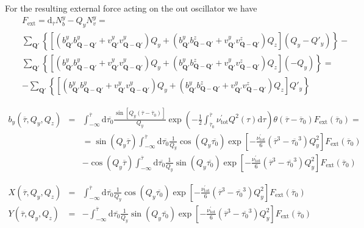 \documentclass[a4paper,11pt]{article}
\begin{document}
For the resulting external force acting on the out oscillator we have
%
\begin{eqnarray}
&&F_\mathrm{ext} =\mathrm{d}_{\overline{\tau}}N_b^y - Q_yN_v^y=\nonumber \\
&&\sum_{\mathbf{Q}'}\left\{ \left[(b_{\mathbf{Q}'}^yb_{\mathbf{Q}-\mathbf{Q}'}^y + v_{\mathbf{Q}'}^yv_{\mathbf{Q}-\mathbf{Q}'}^y)Q_y + (b_{\mathbf{Q}'}^yb_{\mathbf{Q}-\mathbf{Q}'}^z + v_{\mathbf{Q}'}^yv_{\mathbf{Q}-\mathbf{Q}'}^z)Q_z\right](Q_y-Q'_y)\right\} -\\
&&\sum_{\mathbf{Q}'}\left\{ \left[(b_{\mathbf{Q}'}^yb_{\mathbf{Q}-\mathbf{Q}'}^y + v_{\mathbf{Q}'}^yv_{\mathbf{Q}-\mathbf{Q}'}^y)Q_y + (b_{\mathbf{Q}'}^yb_{\mathbf{Q}-\mathbf{Q}'}^z + v_{\mathbf{Q}'}^yv_{\mathbf{Q}-\mathbf{Q}'}^z)Q_z\right](-Q_y)\right\}=\\
&&-\sum_{\mathbf{Q}'}\left\{ \left[(b_{\mathbf{Q}'}^yb_{\mathbf{Q}-\mathbf{Q}'}^y + v_{\mathbf{Q}'}^yv_{\mathbf{Q}-\mathbf{Q}'}^y)Q_y + (b_{\mathbf{Q}'}^yb_{\mathbf{Q}-\mathbf{Q}'}^z + v_{\mathbf{Q}'}^yv_{\mathbf{Q}-\mathbf{Q}'}^z)Q_z\right]Q'_y\right\}
\end{eqnarray}



\begin{eqnarray}
b_y(\overline{\tau},Q_y,Q_z) &=&
\int_{-\infty}^{\overline{\tau}} \mathrm{d}\overline{\tau_0} \frac{\sin[Q_y(\overline{\tau}-\overline{\tau}_0)]}{Q_y}
\exp\left(-\frac12\int^{\overline{\tau}}_{\overline{\tau}_0} \nu^\prime_\mathrm{tot} Q^2(\tau) \mathrm{d}\tau \right) \theta(\overline{\tau}-\overline{\tau}_0) F_\mathrm{ext}(\overline{\tau}_0)=\\
&&= \sin(Q_y\overline{\tau}) \int^{\overline{\tau}}_{-\infty}\mathrm{d}\overline{\tau_0} \frac1{Q_y}\cos(Q_y\overline{\tau_0})\exp\left[ -\frac{\nu^{\prime}_{\mathrm{tot}}}{6}(\overline{\tau}^3 - \overline{\tau_0}^3)Q_y^2 \right]  F_\mathrm{ext}(\overline{\tau}_0) \nonumber \\
&& - \cos(Q_y\overline{\tau}) \int^{\overline{\tau}}_{-\infty}\mathrm{d}\overline{\tau_0} \frac1{Q_y}\sin(Q_y\overline{\tau_0})\exp\left[ -\frac{\nu^{\prime}_{\mathrm{tot}}}{6}(\overline{\tau}^3 - \overline{\tau_0}^3)Q_y^2 \right]  F_\mathrm{ext}(\overline{\tau}_0) \nonumber
\end{eqnarray}

\begin{eqnarray}
 X(\overline{\tau},Q_y,Q_z) &=& \int^{\overline{\tau}}_{-\infty}\mathrm{d}\overline{\tau_0} \frac1{Q_y}\cos(Q_y\overline{\tau_0})\exp\left[ -\frac{\nu^{\prime}_{\mathrm{tot}}}{6}(\overline{\tau}^3 - \overline{\tau_0}^3)Q_y^2 \right]  F_\mathrm{ext}(\overline{\tau}_0) \nonumber \\
 Y(\overline{\tau},Q_y,Q_z) &=& - \int^{\overline{\tau}}_{-\infty}\mathrm{d}\overline{\tau_0} \frac1{Q_y}\sin(Q_y\overline{\tau_0})\exp\left[ -\frac{\nu^{\prime}_{\mathrm{tot}}}{6}(\overline{\tau}^3 - \overline{\tau_0}^3)Q_y^2 \right]  F_\mathrm{ext}(\overline{\tau}_0) \nonumber 
\end{eqnarray}
\end{document}
